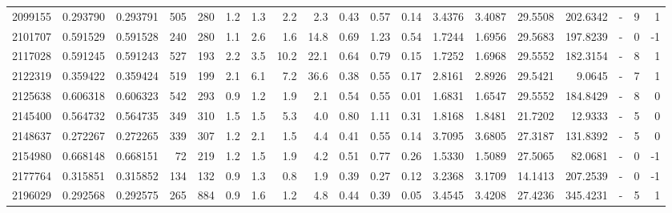 \begin{tabular}{rrrrrrrrrrrrrrrrlrr}
   2099155 & 0.293790 &   0.293791 &  505 &  280 &      1.2 &      1.3 &     2.2 &      2.3 &       0.43 &        0.57 &        0.14 &  3.4376 &  3.4087 &   29.5508 &  202.6342 &             - &        9 &          1 \\
   2101707 & 0.591529 &   0.591528 &  240 &  280 &      1.1 &      2.6 &     1.6 &     14.8 &       0.69 &        1.23 &        0.54 &  1.7244 &  1.6956 &   29.5683 &  197.8239 &             - &        0 &         -1 \\
   2117028 & 0.591245 &   0.591243 &  527 &  193 &      2.2 &      3.5 &    10.2 &     22.1 &       0.64 &        0.79 &        0.15 &  1.7252 &  1.6968 &   29.5552 &  182.3154 &             - &        8 &          1 \\
   2122319 & 0.359422 &   0.359424 &  519 &  199 &      2.1 &      6.1 &     7.2 &     36.6 &       0.38 &        0.55 &        0.17 &  2.8161 &  2.8926 &   29.5421 &    9.0645 &             - &        7 &          1 \\
   2125638 & 0.606318 &   0.606323 &  542 &  293 &      0.9 &      1.2 &     1.9 &      2.1 &       0.54 &        0.55 &        0.01 &  1.6831 &  1.6547 &   29.5552 &  184.8429 &             - &        8 &          0 \\
   2145400 & 0.564732 &   0.564735 &  349 &  310 &      1.5 &      1.5 &     5.3 &      4.0 &       0.80 &        1.11 &        0.31 &  1.8168 &  1.8481 &   21.7202 &   12.9333 &             - &        5 &          0 \\
   2148637 & 0.272267 &   0.272265 &  339 &  307 &      1.2 &      2.1 &     1.5 &      4.4 &       0.41 &        0.55 &        0.14 &  3.7095 &  3.6805 &   27.3187 &  131.8392 &             - &        5 &          0 \\
   2154980 & 0.668148 &   0.668151 &   72 &  219 &      1.2 &      1.5 &     1.9 &      4.2 &       0.51 &        0.77 &        0.26 &  1.5330 &  1.5089 &   27.5065 &   82.0681 &             - &        0 &         -1 \\
   2177764 & 0.315851 &   0.315852 &  134 &  132 &      0.9 &      1.3 &     0.8 &      1.9 &       0.39 &        0.27 &        0.12 &  3.2368 &  3.1709 &   14.1413 &  207.2539 &             - &        0 &         -1 \\
   2196029 & 0.292568 &   0.292575 &  265 &  884 &      0.9 &      1.6 &     1.2 &      4.8 &       0.44 &        0.39 &        0.05 &  3.4545 &  3.4208 &   27.4236 &  345.4231 &             - &        5 &          1 \\

\end{tabular}

